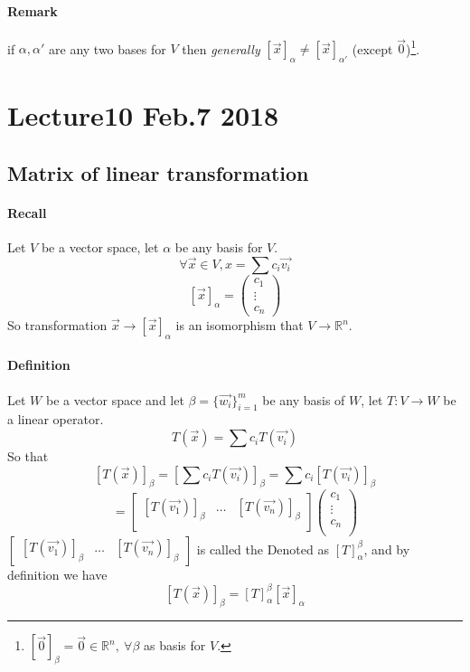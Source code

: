 \documentclass[11pt]{article}
\newcommand{\R}[0]{\mathbb{R}}
\newcommand{\coor}[2]{[\vec{{#1}}]_{{#2}}}
\newcommand{\definition}[0]{\paragraph{Definition}}
\begin{document}
	\paragraph{Remark} if $\alpha, \alpha'$ are any two bases for $V$ then \emph{generally} $[\vec{x}]_\alpha \neq [\vec{x}]_{\alpha'}$ (except $\vec{0}$)\footnote{$\coor{0}{\beta} = \vec{0} \in \R^n,\ \forall \beta$ as basis for $V$.}.
	
	\section{Lecture10 Feb.7 2018}
	\subsection{Matrix of linear transformation}
	\paragraph{Recall} Let $V$ be a vector space, let $\alpha$ be any basis for $V$.
	\[
		\forall \vec{x} \in V, x = \sum{c_i\vec{v_i}}
	\]
	\[
		[\vec{x}]_{\alpha} = \begin{pmatrix}
			c_1 \\
			\vdots \\
			c_n
		\end{pmatrix}
	\]
	So transformation $\vec{x} \to [\vec{x}]_{\alpha}$ is an isomorphism that $V \to \mathbb{R}^n$.
	
	\definition Let $W$ be a vector space and let $\beta = \{\vec{w_i}\}_{i=1}^m$ be any basis of $W$, let $T: V \to W$ be a linear operator.
	\[
		T(\vec{x}) = \sum{c_iT(\vec{v_i})}
	\] So that
	\[
		[T(\vec{x})]_{\beta} = [\sum{c_iT(\vec{v_i})}]_{\beta} = \sum{c_i[T(\vec{v_i})]_{\beta}}
	\]
	\[
		= \begin{bmatrix}
			[T(\vec{v_1})]_\beta & \dots & [T(\vec{v_n})]_\beta \\ 
		\end{bmatrix}
		\begin{pmatrix}
 			c_1 \\
 			\vdots \\
 			c_n	\\
 		\end{pmatrix}
	\]
	$\begin{bmatrix}[T(\vec{v_1})]_\beta & \dots & [T(\vec{v_n})]_\beta \end{bmatrix}$ is called the  Denoted as $[T]_{\alpha}^{\beta}$, and by definition we have
	\[	
		[T(\vec{x})]_{\beta} = [T]_{\alpha}^{\beta} [\vec{x}]_{\alpha}
	\]
	
\end{document}
